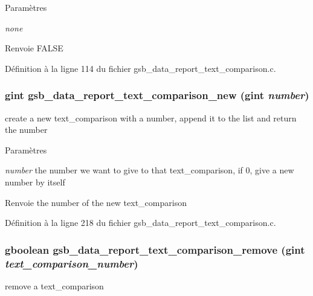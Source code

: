 \begin{DoxyParams}{Paramètres}
\item[{\em none}]\end{DoxyParams}
\begin{DoxyReturn}{Renvoie}
FALSE 
\end{DoxyReturn}


Définition à la ligne 114 du fichier gsb\_\-data\_\-report\_\-text\_\-comparison.c.

\subsubsection[{gsb\_\-data\_\-report\_\-text\_\-comparison\_\-new}]{\setlength{\rightskip}{0pt plus 5cm}gint gsb\_\-data\_\-report\_\-text\_\-comparison\_\-new (gint {\em number})}\label{gsb__data__report__text__comparison_8c_af35ca9a6b7fcb4c502c7307cff60b7f4}
create a new text\_\-comparison with a number, append it to the list and return the number


\begin{DoxyParams}{Paramètres}
\item[{\em number}]the number we want to give to that text\_\-comparison, if 0, give a new number by itself\end{DoxyParams}
\begin{DoxyReturn}{Renvoie}
the number of the new text\_\-comparison 
\end{DoxyReturn}


Définition à la ligne 218 du fichier gsb\_\-data\_\-report\_\-text\_\-comparison.c.

\subsubsection[{gsb\_\-data\_\-report\_\-text\_\-comparison\_\-remove}]{\setlength{\rightskip}{0pt plus 5cm}gboolean gsb\_\-data\_\-report\_\-text\_\-comparison\_\-remove (gint {\em text\_\-comparison\_\-number})}\label{gsb__data__report__text__comparison_8c_a7eebd5fca03217c83bd7cbbbfee5ea95}
remove a text\_\-comparison


